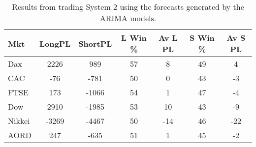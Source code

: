 \begin{table}[ht]
\centering
\caption[Results from trading System 2 using the forecasts generated by the ARIMA models]{Results from trading System 2 using the forecasts generated by the ARIMA models.} 
\label{tab:chp_ts:arima2}
\begin{tabular}{lcccccc}
  \toprule Mkt & LongPL & ShortPL & L Win \% & Av L PL & S Win \% & Av S PL \\ 
  \midrule Dax & 2226 & 989 & 57 & 8 & 49 & 4 \\ 
  CAC & -76 & -781 & 50 & 0 & 43 & -3 \\ 
  FTSE & 173 & -1066 & 54 & 1 & 47 & -4 \\ 
  Dow & 2910 & -1985 & 53 & 10 & 43 & -9 \\ 
  Nikkei & -3269 & -4467 & 50 & -14 & 46 & -22 \\ 
  AORD & 247 & -635 & 51 & 1 & 45 & -2 \\ 
   \bottomrule \end{tabular}
\end{table}
